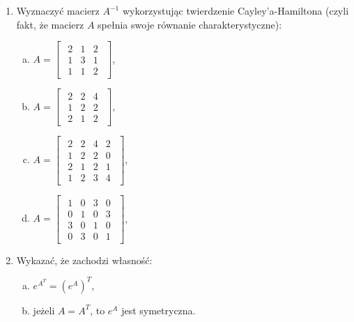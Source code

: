 \documentclass{article}
\begin{document}
\begin{enumerate}
\item 
Wyznaczyć macierz $A^{-1}$ wykorzystując twierdzenie Cayley'a-Hamiltona (czyli fakt, że macierz $A$ spełnia swoje równanie charakterystyczne):
        \begin{enumerate}[a)]
            \item $A = \begin{bmatrix}\begin{array}{rrr} 2 & 1 & 2\\ 1 & 3 & 1\\ 1 & 1 & 2 \end{array}\end{bmatrix}$,
            \item $A = \begin{bmatrix}\begin{array}{rrr} 2 & 2 & 4\\ 1 & 2 & 2\\ 2 & 1 & 2 \end{array}\end{bmatrix}$,
            \item $A = \begin{bmatrix}\begin{array}{rrrr} 2 & 2 & 4 & 2\\ 1 & 2 & 2 & 0\\ 2 & 1 & 2 & 1 \\ 1 & 2 & 3 & 4\end{array}\end{bmatrix}$,
            \item $A = \begin{bmatrix}\begin{array}{rrrr} 1 & 0 & 3 & 0\\ 0 & 1 & 0 & 3\\ 3 & 0 & 1 & 0 \\ 0 & 3 & 0 & 1\end{array}\end{bmatrix}$,
        \end{enumerate} 

\item 
Wykazać, że zachodzi własność:
    \begin{enumerate}[a)]
        \item $e^{A^{T}} = \left( e^{A}\right)^{T} $,
        \item jeżeli $A=A^{T}$, to $e^{A}$ jest symetryczna.
    \end{enumerate}
\end{enumerate}
\end{document}
